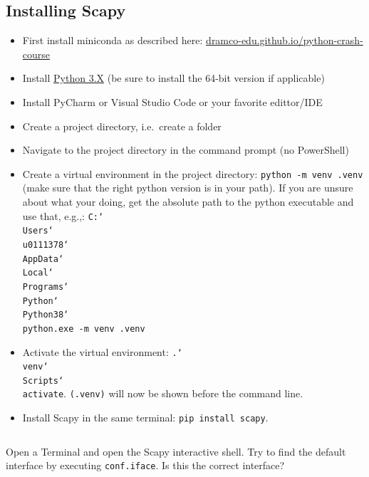 \documentclass[11pt,a4paper]{article}
\begin{document}
\subsection{Installing Scapy}
\begin{itemize}
    \item First install miniconda as described here: \url{dramco-edu.github.io/python-crash-course}
    \item Install \href{https://www.python.org/downloads}{Python 3.X} (be sure to install the 64-bit version if applicable)
    \item Install PyCharm or Visual Studio Code or your favorite edittor/IDE
    \item Create a project directory, i.e.\ create a folder
    \item Navigate to the project directory in the command prompt (no PowerShell)
    \item Create a virtual environment in the project directory: \texttt{python -m venv .venv} (make sure that the right python version is in your path). If you are unsure about what your doing, get the absolute path to the python executable and use that, e.g.,:
    \texttt{C:\char`\\Users\char`\\u0111378\char`\\AppData\char`\\Local\char`\\Programs\char`\\Python\char`\\Python38\char`\\python.exe -m venv .venv}
    \item Activate the virtual environment:
    \texttt{.\char`\\venv\char`\\Scripts\char`\\activate}. \texttt{(.venv)} will now be shown before the command line.
    \item Install Scapy in the same terminal: \texttt{pip install scapy}.
\end{itemize}

\begin{listing}[h]
\inputminted{batch}{../code_students/create_scapy_project.cmd}
\end{listing}


\begin{question}
    Open a Terminal and open the Scapy interactive shell. Try to find the default interface by executing \texttt{conf.iface}. Is this the correct interface? 
\end{question}
\end{document}
